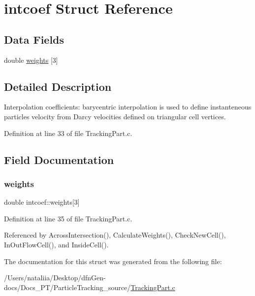 \hypertarget{structintcoef}{}\section{intcoef Struct Reference}
\label{structintcoef}
\subsection*{Data Fields}
\begin{DoxyCompactItemize}
\item 
double \mbox{\hyperlink{structintcoef_ab3d267bf2bc81e221bed2ebc1779dbf0}{weights}} \mbox{[}3\mbox{]}
\end{DoxyCompactItemize}


\subsection{Detailed Description}
Interpolation coefficients\+: barycentric interpolation is used to define instanteneous particle\textquotesingle{}s velocity from Darcy velocities defined on triangular cell vertices. 

Definition at line 33 of file Tracking\+Part.\+c.



\subsection{Field Documentation}
\mbox{\label{structintcoef_ab3d267bf2bc81e221bed2ebc1779dbf0}} 
\subsubsection{\texorpdfstring{weights}{weights}}
{\footnotesize\ttfamily double intcoef\+::weights\mbox{[}3\mbox{]}}



Definition at line 35 of file Tracking\+Part.\+c.



Referenced by Across\+Intersection(), Calculate\+Weights(), Check\+New\+Cell(), In\+Out\+Flow\+Cell(), and Inside\+Cell().



The documentation for this struct was generated from the following file\+:\begin{DoxyCompactItemize}
\item 
/\+Users/nataliia/\+Desktop/dfn\+Gen-\/docs/\+Docs\+\_\+\+P\+T/\+Particle\+Tracking\+\_\+source/\mbox{\hyperlink{_tracking_part_8c}{Tracking\+Part.\+c}}\end{DoxyCompactItemize}
